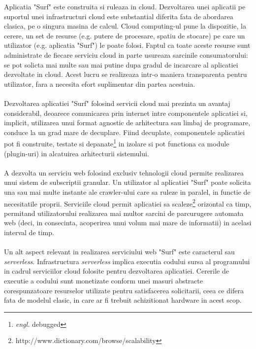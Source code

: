 \newcommand{\scalabilityDefinition}{http://www.dictionary.com/browse/scalability}

Aplicatia "Surf" este construita si ruleaza in cloud. Dezvoltarea unei aplicatii pe suportul unei infrastructuri cloud este substantial diferita fata de abordarea clasica, pe o singura masina de calcul. Cloud computing-ul pune la dispozitie, la cerere, un set de resurse (e.g. putere de procesare, spatiu de stocare) pe care un utilizator (e.g. aplicatia "Surf") le poate folosi. Faptul ca toate aceste resurse sunt administrate de fiecare serviciu cloud in parte usureaza sarcinile consumatorului: se pot solicta mai multe sau mai putine dupa gradul de incarcare al aplicatiei dezvoltate in cloud. Acest lucru se realizeaza intr-o maniera transparenta pentru utilizator, fara a necesita efort suplimentar din partea acestuia.
\\
\\
Dezvoltarea aplicatiei "Surf" folosind servicii cloud mai prezinta un avantaj considerabil, deoarece comunicarea prin internet intre componentele aplicatiei si, implicit, utilizarea unui format agnostic de arhitectura sau limbaj de programare, conduce la un grad mare de decuplare. Fiind decuplate, componentele aplicatiei pot fi construite, testate si depanate\footnote{\emph{engl.} debugged} in izolare si pot functiona ca module (plugin-uri) in alcatuirea arhitecturii sistemului.
\\
\\
A dezvolta un serviciu web folosind exclusiv tehnologii cloud permite realizarea unui sistem de subscriptii granular. Un utilizator al aplicatiei "Surf" poate solicita una sau mai multe instante ale crawler-ului care sa ruleze in paralel, in functie de necesitatile proprii. Serviciile cloud permit aplicatiei sa scaleze\footnote{\scalabilityDefinition} orizontal ca timp, permitand utilizatorului realizarea mai multor sarcini de parcurugere automata web (deci, in consecinta, acoperirea unui volum mai mare de informatii) in acelasi interval de timp.
\\
\\
Un alt aspect relevant in realizarea serviciului web "Surf" este caracterul sau \emph{serverless}. Infrastructura \emph{serverless} implica executia codului sursa al programului in cadrul serviciilor cloud folosite pentru dezvoltarea aplicatiei. Cererile de executie a codului sunt monetizate conform unei masuri abstracte corespunzatoare resurselor utilizate pentru satisfacerea solicitarii, ceea ce difera fata de modelul clasic, in care ar fi trebuit achizitionat hardware in acest scop\cite{serverless-characterization}.
